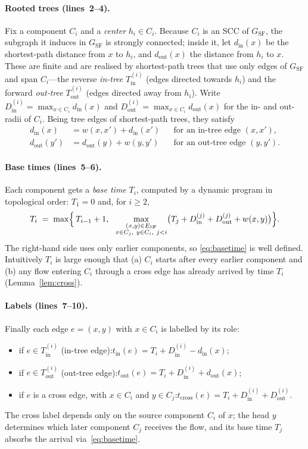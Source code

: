\documentclass[11pt]{article}
\theoremstyle{definition}
\theoremstyle{remark}
\newcommand{\ESF}{E_{\mathrm{SF}}}
\newcommand{\GSF}{G_{\mathrm{SF}}}
\newcommand{\Tin}{T^{(i)}_{\mathrm{in}}}
\newcommand{\Tout}{T^{(i)}_{\mathrm{out}}}
\newcommand{\din}{d_{\mathrm{in}}}
\newcommand{\dout}{d_{\mathrm{out}}}
\newcommand{\Din}{D^{(i)}_{\mathrm{in}}}
\newcommand{\Dout}{D^{(i)}_{\mathrm{out}}}
\begin{document}
\paragraph{Rooted trees (lines~2--4).} Fix a component $C_i$ and a \emph{center} $h_i\in C_i$. Because $C_i$ is an SCC of $\GSF$, the
subgraph it induces in $\GSF$ is strongly connected; inside it, let $\din(x)$ be the shortest-path
distance from $x$ to $h_i$, and $\dout(x)$ the distance from $h_i$ to $x$. These are
finite and are realised by shortest-path trees that use only edges of $\GSF$ and span $C_i$---the
reverse \emph{in-tree} $\Tin$ (edges directed towards $h_i$) and the forward \emph{out-tree} $\Tout$
(edges directed away from $h_i$). Write $\Din=\max_{x\in C_i}\din(x)$ and $\Dout=\max_{x\in C_i}\dout(x)$ for the in- and
out-radii of $C_i$. Being tree edges of shortest-path trees, they satisfy
\begin{equation}\label{eq:treerec}
\begin{aligned}
  \din(x)&=w(x,x')+\din(x') && \text{for an in-tree edge }(x,x'),\\
  \dout(y')&=\dout(y)+w(y,y') && \text{for an out-tree edge }(y,y').
\end{aligned}
\end{equation}

\paragraph{Base times (lines~5--6).} Each component gets a \emph{base time} $T_i$, computed by a
dynamic program in topological order: $T_1=0$ and, for $i\ge2$,
\begin{equation}\label{eq:basetime}
  T_i \;=\; \max\Bigl\{\,T_{i-1}+1,\ \
    \max_{\substack{(x,y)\in\ESF\\ x\in C_j,\ y\in C_i,\ j<i}}
    \bigl(T_j+D^{(j)}_{\mathrm{in}}+D^{(j)}_{\mathrm{out}}+w(x,y)\bigr)\Bigr\}.
\end{equation}
The right-hand side uses only earlier components, so \eqref{eq:basetime} is well defined. Intuitively
$T_i$ is large enough that (a) $C_i$ starts after every earlier component and (b) any flow entering
$C_i$ through a cross edge has already arrived by time $T_i$ (Lemma~\ref{lem:cross}).

\paragraph{Labels (lines~7--10).} Finally each edge $e=(x,y)$ with $x\in C_i$ is labelled by its role:
\begin{itemize}[topsep=2pt,itemsep=3pt]
  \item if $e\in\Tin$ (in-tree edge):\quad $t_{\mathrm{in}}(e)=T_i+\Din-\din(x)$;
  \item if $e\in\Tout$ (out-tree edge):\quad $t_{\mathrm{out}}(e)=T_i+\Din+\dout(x)$;
  \item if $e$ is a cross edge, with $x\in C_i$ and $y\in C_j$:\quad $t_{\mathrm{cross}}(e)=T_i+\Din+\Dout$.
\end{itemize}
The cross label depends only on the source component $C_i$ of $x$; the head $y$ determines which later
component $C_j$ receives the flow, and its base time $T_j$ absorbs the arrival via~\eqref{eq:basetime}.
\end{document}
